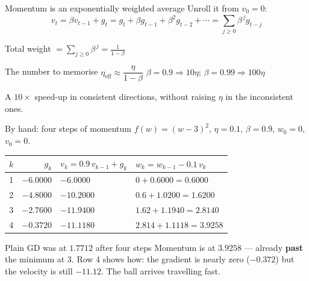 \documentclass[aspectratio=169]{beamer}
\begin{document}
\begin{frame}{Momentum is an exponentially weighted average}
  Unroll it from $v_0 = 0$:
  \[
    v_t = \beta v_{t-1} + g_t
        = g_t + \beta g_{t-1} + \beta^2 g_{t-2} + \cdots
        = \sum_{j\ge 0} \beta^{\,j} g_{t-j}
  \]
  \vspace{0.1em}
  \begin{center}
    Total weight $= \displaystyle\sum_{j \ge 0}\beta^{\,j} = \frac{1}{1-\beta}$
  \end{center}
  \vspace{0.5em}
  \begin{exampleblock}{The number to memorise}
    \centering\Large
    $\eta_{\text{eff}} \approx \dfrac{\eta}{1-\beta}$
    \qquad
    {\normalsize $\beta = 0.9 \Rightarrow 10\eta$; \quad
                 $\beta = 0.99 \Rightarrow 100\eta$}
  \end{exampleblock}
  \vspace{0.3em}
  \begin{center}\small
    A $10\times$ speed-up in consistent directions, without raising $\eta$ in
    the inconsistent ones.
  \end{center}
\end{frame}

\begin{frame}[shrink=8]{By hand: four steps of momentum}
  $f(w) = (w-3)^2$, \; $\eta = 0.1$, \; $\beta = 0.9$, \; $w_0 = 0$, $v_0 = 0$.
  \begin{center}\small
  \begin{tabular}{@{}rrll@{}}
    \toprule
    $k$ & $g_k$ & $v_k = 0.9\,v_{k-1} + g_k$ & $w_k = w_{k-1} - 0.1\,v_k$\\
    \midrule
    1 & $-6.0000$ & $-6.0000$   & $0 + 0.6000 = 0.6000$\\
    2 & $-4.8000$ & $-10.2000$  & $0.6 + 1.0200 = 1.6200$\\
    3 & $-2.7600$ & $-11.9400$  & $1.62 + 1.1940 = 2.8140$\\
    4 & $-0.3720$ & $-11.1180$  & $2.814 + 1.1118 = \mathbf{3.9258}$\\
    \bottomrule
  \end{tabular}
  \end{center}
  \vspace{0.2em}
  \begin{alertblock}{Plain GD was at $1.7712$ after four steps}
    \small Momentum is at $3.9258$ --- already \textbf{past} the minimum at
    $3$. Row 4 shows how: the gradient is nearly zero ($-0.372$) but the
    velocity is still $-11.12$. The ball arrives travelling fast.
  \end{alertblock}
\end{frame}
\end{document}
